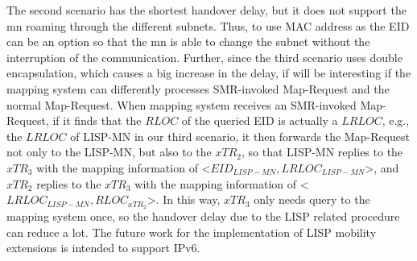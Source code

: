The second scenario has the shortest handover delay, but it does not support the \acrshort{mn} roaming through the different subnets. Thus, to use MAC address as the EID can be an option so that the \acrshort{mn} is able to change the subnet without the interruption of the communication. Further, since the third scenario uses double encapsulation, which causes a big increase in the delay, if will be interesting if the mapping system can differently processes SMR-invoked Map-Request and the normal Map-Request. When mapping system receives an SMR-invoked Map-Request, if it finds that the $RLOC$ of the queried EID is actually a $LRLOC$, e.g., the $LRLOC$ of LISP-MN in our third scenario, it then forwards the Map-Request not only to the LISP-MN, but also to the $xTR_2$, so that LISP-MN replies to the $xTR_3$ with the mapping information of <$EID_{LISP-MN}, LRLOC_{LISP-MN}$>, and $xTR_2$ replies to the $xTR_3$ with the mapping information of <$LRLOC_{LISP-MN}, RLOC_{xTR_2}$>. In this way, $xTR_3$ only needs query to the mapping system once, so the handover delay due to the LISP related procedure can reduce a lot. The future work for the implementation of LISP mobility extensions is intended to support IPv6. %